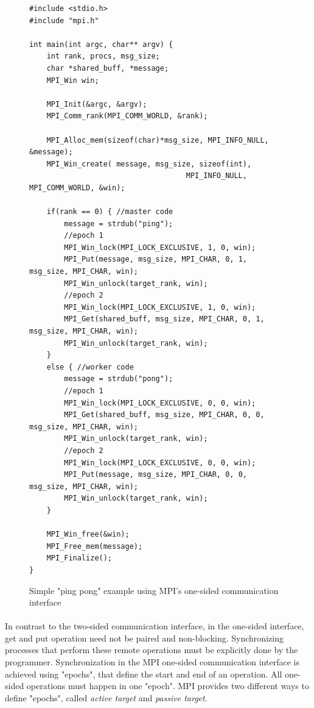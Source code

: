 \begin{figure}[!ht]
\begin{lstlisting}
#include <stdio.h>
#include "mpi.h"

int main(int argc, char** argv) {
	int rank, procs, msg_size;
	char *shared_buff, *message;
	MPI_Win win;

	MPI_Init(&argc, &argv);
	MPI_Comm_rank(MPI_COMM_WORLD, &rank);

	MPI_Alloc_mem(sizeof(char)*msg_size, MPI_INFO_NULL, &message);
	MPI_Win_create(	message, msg_size, sizeof(int), 
									MPI_INFO_NULL, MPI_COMM_WORLD, &win);

	if(rank == 0) { //master code
		message = strdub("ping");
		//epoch 1
		MPI_Win_lock(MPI_LOCK_EXCLUSIVE, 1, 0, win);
		MPI_Put(message, msg_size, MPI_CHAR, 0, 1, msg_size, MPI_CHAR, win);
		MPI_Win_unlock(target_rank, win);
		//epoch 2
		MPI_Win_lock(MPI_LOCK_EXCLUSIVE, 1, 0, win);
		MPI_Get(shared_buff, msg_size, MPI_CHAR, 0, 1, msg_size, MPI_CHAR, win);
		MPI_Win_unlock(target_rank, win);
	}
	else { //worker code
		message = strdub("pong");
		//epoch 1
		MPI_Win_lock(MPI_LOCK_EXCLUSIVE, 0, 0, win);
		MPI_Get(shared_buff, msg_size, MPI_CHAR, 0, 0, msg_size, MPI_CHAR, win);
		MPI_Win_unlock(target_rank, win);
		//epoch 2
		MPI_Win_lock(MPI_LOCK_EXCLUSIVE, 0, 0, win);
		MPI_Put(message, msg_size, MPI_CHAR, 0, 0, msg_size, MPI_CHAR, win);
		MPI_Win_unlock(target_rank, win);
	}

	MPI_Win_free(&win);
	MPI_Free_mem(message);
	MPI_Finalize();
}
\end{lstlisting}
\caption{Simple "ping pong" example using MPI's one-sided communication interface}
\label{lst:ping-pong-mpi}
\end{figure}

\paragraph{}
In contrast to the two-sided communication interface, in the one-sided interface, get and put operation need not 
be paired and non-blocking. Synchronizing processes that perform these remote operations must be explicitly
done by the programmer.  Synchronization in the MPI one-sided communication interface is achieved using "epochs",
that define the start and end of an operation.  All one-sided operations must happen in one "epoch".  MPI provides
two different ways to define "epochs", called \emph{active target} and \emph{passive target}.

